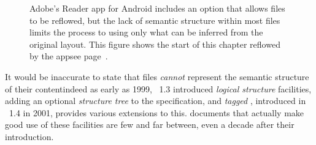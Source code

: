 \begin{figure}
\caption[Reflowed text of a \textsc{pdf} file]{Adobe's Reader app for Android includes an option that allows \pdf{} files to be reflowed, but the lack of semantic structure within most \pdf{} files limits the process to using only what can be inferred from the original layout. This figure shows the start of this chapter reflowed by the app\ed{}see page~\pageref{ch:intro}.}
\label{fig:acrobatreflow}
\end{figure}

It would be inaccurate to state that \pdf{} files \emph{cannot} represent the semantic structure of their content\ed indeed as early as 1999, \pdf{}~1.3 introduced \emph{logical structure} facilities,\hspace{0pt}\cite{ASI2001} adding an optional \emph{structure tree} to the \pdf{} specification, and \emph{tagged \pdf{}}, introduced in \pdf{}~1.4 in 2001, provides various extensions to this. \pdf{} documents that actually make good use of these facilities are few and far between, even a decade after their introduction.

